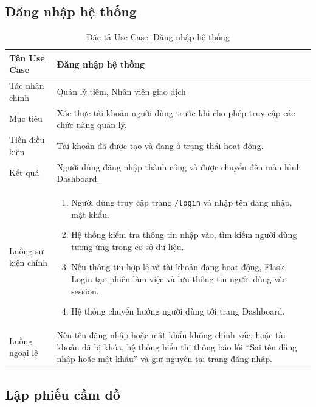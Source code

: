 \documentclass[13pt,a4paper]{extreport}
\begin{document}
\subsection*{Đăng nhập hệ thống}

\begin{table}[H]
\centering
\caption{Đặc tả Use Case: Đăng nhập hệ thống}
\label{tab:uc-login}
\begin{tabular}{p{4cm}p{10cm}}
\hline
Tên Use Case & Đăng nhập hệ thống\\
\hline
Tác nhân chính & Quản lý tiệm, Nhân viên giao dịch\\
Mục tiêu & Xác thực tài khoản người dùng trước khi cho phép truy cập các chức năng quản lý.\\
Tiền điều kiện & Tài khoản đã được tạo và đang ở trạng thái hoạt động.\\
Kết quả & Người dùng đăng nhập thành công và được chuyển đến màn hình Dashboard.\\
\hline
Luồng sự kiện chính &
\begin{enumerate}
\item Người dùng truy cập trang \texttt{/login} và nhập tên đăng nhập, mật khẩu.
\item Hệ thống kiểm tra thông tin nhập vào, tìm kiếm người dùng tương ứng trong cơ sở dữ liệu.
\item Nếu thông tin hợp lệ và tài khoản đang hoạt động, Flask-Login tạo phiên làm việc và lưu thông tin người dùng vào session.
\item Hệ thống chuyển hướng người dùng tới trang Dashboard.
\end{enumerate}\\
\hline
Luồng ngoại lệ &
Nếu tên đăng nhập hoặc mật khẩu không chính xác, hoặc tài khoản đã bị khóa, hệ thống hiển thị thông báo lỗi ``Sai tên đăng nhập hoặc mật khẩu'' và giữ nguyên tại trang đăng nhập.\\
\hline
\end{tabular}
\end{table}

\subsection*{Lập phiếu cầm đồ}
\end{document}
